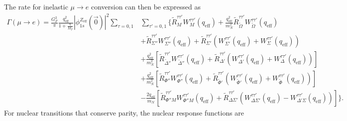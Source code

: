 \documentclass{book}[letterpaper,12pt]
\begin{document}
The rate for inelastic $\mu\rightarrow e$ conversion can then be expressed as
\begin{equation}
\begin{split}
\Gamma\left(\mu\rightarrow e\right)=\frac{G_F^2}{\pi}\frac{q_\mathrm{eff}^2}{1+\frac{q}{M_T}}|\phi_{1s}^{Z_\mathrm{eff}}(\vec{0})|^2\sum_{\tau=0,1}&\sum_{\tau'=0,1}\Bigg\{\tilde{R}_M^{\tau\tau'}W_M^{\tau\tau'}(q_\mathrm{eff})+\frac{q_\mathrm{eff}^2}{m_N^2}\tilde{R}_{\tilde{\Omega}}^{\tau\tau'}W_{\tilde{\Omega}}^{\tau\tau'}(q_\mathrm{eff})\\
&+\tilde{R}_{\Sigma''}^{\tau\tau'}W_{\Sigma''}^{\tau\tau'}(q_\mathrm{eff})+\tilde{R}_{\Sigma'}^{\tau\tau'}\left(W_{\Sigma'}^{\tau\tau'}(q_\mathrm{eff})+W_{\Sigma}^{\tau\tau'}(q_\mathrm{eff})\right)\\
&+\frac{q_\mathrm{eff}^2}{m_N^2}\left[\tilde{R}_{\tilde{\Delta}''}^{\tau\tau'}W_{\tilde{\Delta}''}^{\tau\tau'}(q_\mathrm{eff})+\tilde{R}_{\Delta'}^{\tau\tau'}\left(W_{\Delta'}^{\tau\tau'}(q_\mathrm{eff})+W_{\Delta}^{\tau\tau'}(q_\mathrm{eff})\right)\right]\\
&+\frac{q_\mathrm{eff}^2}{m_N^2}\left[\tilde{R}_{\Phi''}^{\tau\tau'}W_{\Phi''}^{\tau\tau'}(q_\mathrm{eff})+\tilde{R}_{\tilde{\Phi}'}^{\tau\tau'}\left(W_{\tilde{\Phi}'}^{\tau\tau'}(q_\mathrm{eff})+W_{\tilde{\Phi}}^{\tau\tau'}(q_\mathrm{eff})\right)\right]\\
&-\frac{2q_\mathrm{eff}}{m_N}\left[\tilde{R}_{\Phi'' M}^{\tau\tau'}W_{\Phi'' M}^{\tau\tau'}(q_\mathrm{eff})+\tilde{R}_{\Delta\Sigma'}^{\tau\tau'}\left(W_{\Delta\Sigma'}^{\tau\tau'}(q_\mathrm{eff})-W_{\Delta'\Sigma}^{\tau\tau'}(q_\mathrm{eff})\right)\right]\Bigg\}.
\end{split}
\label{eq:inelastic_rate}
\end{equation}
For nuclear transitions that conserve parity, the nuclear response functions are 
\end{document}
